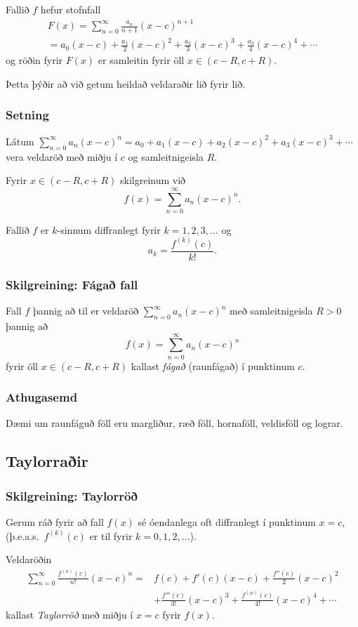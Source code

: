 \documentclass[icelandic,a4paper,12pt]{article}
\begin{document}
Fallið $f$ hefur stofnfall 
\begin{multline*}
F(x)=\sum_{n=0}^\infty \frac{a_n}{n+1}(x-c)^{n+1} \\
=a_0(x-c)+\frac{a_1}{2}(x-c)^2+\frac{a_2}{3}(x-c)^3+
\frac{a_3}{4}(x-c)^4+\cdots
\end{multline*}
og röðin fyrir $F(x)$  er samleitin fyrir öll $x\in(c-R, c+R)$.

Þetta þýðir að við getum heildað veldaraðir lið fyrir lið.

\subsubsection{Setning}
Látum $\sum_{n=0}^\infty a_n(x-c)^n=a_0+a_1(x-c)+a_2(x-c)^2+a_3(x-c)^3+\cdots$
vera veldaröð með miðju í $c$ og samleitnigeisla $R$. 

Fyrir $x\in(c-R, c+R)$ skilgreinum við 
$$f(x)=\sum_{n=0}^\infty a_n(x-c)^n.$$

Fallið $f$ er $k$-sinnum diffranlegt fyrir $k=1, 2, 3, \ldots$ og
$$a_k=\frac{f^{(k)}(c)}{k!}.$$

\subsubsection{Skilgreining: Fágað fall}  
Fall $f$ þannig að til er veldaröð $\sum_{n=0}^\infty a_n(x-c)^n$ með
samleitnigeisla $R>0$ þannig að $$f(x)=\sum_{n=0}^\infty a_n(x-c)^n$$
fyrir öll $x\in(c-R, c+R)$ kallast \emph{fágað} (raunfágað) í punktinum $c$.

\subsubsection{Athugasemd}
Dæmi um raunfáguð föll eru margliður, ræð föll, hornaföll, veldisföll og lograr. 

\subsection{Taylorraðir}
\subsubsection{Skilgreining: Taylorröð}
Gerum ráð fyrir að fall $f(x)$ sé óendanlega oft diffranlegt í
punktinum $x=c$,  (þ.e.a.s.~$f^{(k)}(c)$ er til fyrir $k=0, 1, 2, \ldots$).  

Veldaröðin 
\begin{align*}
\sum_{n=0}^\infty \frac{f^{(n)}(c)}{n!}(x-c)^n = & f(c)+f'(c)(x-c)+
\frac{f''(c)}{2}(x-c)^2 \\ & + \frac{f'''(c)}{3!}(x-c)^3 
+ \frac{f^{(iv)}(c)}{4!}(x-c)^4 + \cdots 
\end{align*}
kallast \emph{Taylorröð} með miðju í $x=c$ fyrir $f(x)$.  
\end{document}
